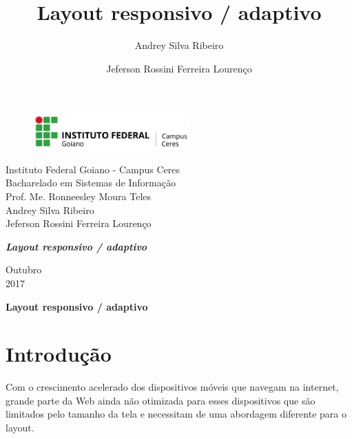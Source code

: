 \documentclass[12pt,a4paper]{article}
\title{Layout responsivo / adaptivo}
\author{Andrey Silva Ribeiro \and Jeferson Rossini Ferreira Lourenço}
\begin{document}
\begin{titlepage}


\begin{center}
\begin{figure}[htb]
		
		\label{figura:LogoIF}
	
		\centering
		\includegraphics[width=6cm]{logo.png} 
\end{figure}


Instituto Federal Goiano - Campus Ceres\\
Bacharelado em Sistemas de Informação\\
Prof. Me. Ronneesley Moura Teles\\\vspace{0.2cm}
Andrey Silva Ribeiro \\
Jeferson Rossini Ferreira Lourenço \\

\vspace{5.0cm}

\textit{\textbf{\Large Layout responsivo / adaptivo}}\\\vspace{0.5cm}
\vspace{9.5cm}

Outubro\\
2017\\
\end{center}
\end{titlepage}



\tableofcontents

\newpage
\begin{center}
\textbf{\Large{Layout responsivo / adaptivo}}\\\vspace{0.5cm}
\end{center}

\section{Introdução}

Com o crescimento acelerado dos dispositivos móveis que navegam na internet, grande parte da Web ainda não otimizada para esses dispositivos que são limitados pelo tamanho da tela e necessitam de uma abordagem diferente para o layout.
\end{document}
